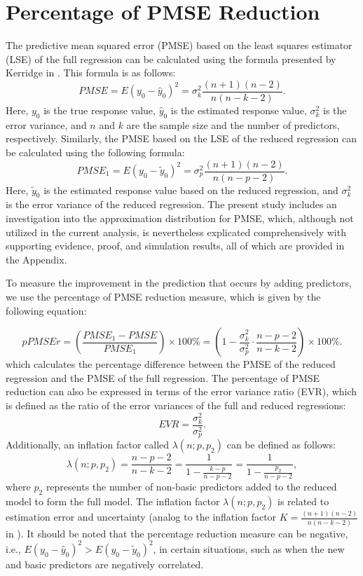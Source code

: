 \section{Percentage of PMSE Reduction}

The predictive mean squared error (PMSE) based on the least squares estimator (LSE) of the full regression can be calculated using the formula presented by Kerridge in \cite{kerridge1967errors}. This formula is as follows:
\begin{equation}\label{equation:PMSE}
PMSE = E(y_0 - \hat{y}_0)^2 = \sigma_k^2 \frac{(n+1)(n-2)}{n(n-k-2)}.
\end{equation}
Here, $y_0$ is the true response value, $\hat{y}_0$ is the estimated response value, $\sigma_k^2$ is the error variance, and $n$ and $k$ are the sample size and the number of predictors, respectively.
Similarly, the PMSE based on the LSE of the reduced regression can be calculated using the following formula:
\begin{equation}\label{equation:PMSE1}
PMSE_1 = E(y_0 - \tilde{y}_0)^2 = \sigma_p^2 \frac{(n+1)(n-2)}{n(n-p-2)}.
\end{equation}
Here, $\tilde{y}_0$ is the estimated response value based on the reduced regression, and $\sigma_k^2$ is the error variance of the reduced regression. 
The present study includes an investigation into the approximation distribution for PMSE, which, although not utilized in the current analysis, is nevertheless explicated comprehensively with supporting evidence, proof, and simulation results, all of which are provided in the Appendix.

To measure the improvement in the prediction that occurs by adding predictors, we use the percentage of PMSE reduction measure, which is given by the following equation:

\begin{equation}
\label{eq:pPMSEr}
pPMSEr = \left(\frac{PMSE_1 - PMSE}{PMSE_1} \right)\times 100\%
= \left(1 - \frac{\sigma_k^2}{\sigma_p^2} \cdot \frac{n-p-2}{n-k-2}\right)\times 100\%.
\end{equation}
which calculates the percentage difference between the PMSE of the reduced regression and the PMSE of the full regression. 
The percentage of PMSE reduction can also be expressed in terms of the error variance ratio (EVR), which is defined as the ratio of the error variances of the full and reduced regressions:
$$
EVR = \frac{\sigma_k^2}{\sigma_p^2}. 
$$
Additionally, an inflation factor called $\lambda(n;p,p_2)$ can be defined as follows:$$
\lambda(n; p, p_2) = \frac{n-p-2}{n-k-2} =  \frac{1}{1 - \frac{k-p}{n-p-2}} = \frac{1}{1 - \frac{p_2}{n-p-2}}, 
$$
where $p_2$ represents the number of non-basic predictors added to the reduced model to form the full model.
The inflation factor $\lambda(n; p, p_2)$ is related to estimation error and uncertainty (analog to the inflation factor $K = \frac{(n+1)(n-2)}{n(n-k-2)}$ in \cite{sawyer1982sample}).  It should be noted that the percentage reduction measure can be negative, i.e., $E(y_0 - \hat{y}_0)^2 > E(y_0 - \tilde{y}_0)^2$, in certain situations, such as when the new and basic predictors are negatively correlated.



